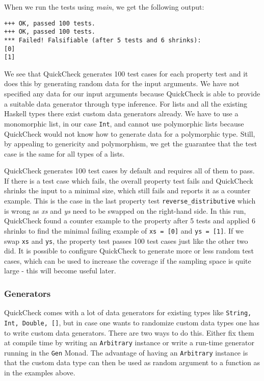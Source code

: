 When we run the tests using \textit{main}, we get the following output:

\begin{verbatim}
+++ OK, passed 100 tests.
+++ OK, passed 100 tests.
*** Failed! Falsifiable (after 5 tests and 6 shrinks):    
[0]
[1]
\end{verbatim}

We see that QuickCheck generates 100 test cases for each property test and it does this by generating random data for the input arguments. We have not specified any data for our input arguments because QuickCheck is able to provide a suitable data generator through type inference. For lists and all the existing Haskell types there exist custom data generators already. We have to use a monomorphic list, in our case \texttt{Int}, and cannot use polymorphic lists because QuickCheck would not know how to generate data for a polymorphic type. Still, by appealing to genericity and polymorphism, we get the guarantee that the test case is the same for all types of a lists.

QuickCheck generates 100 test cases by default and requires all of them to pass. If there is a test case which fails, the overall property test fails and QuickCheck shrinks the input to a minimal size, which still fails and reports it as a counter example. This is the case in the last property test \texttt{reverse\_distributive} which is wrong as \textit{xs} and \textit{ys} need to be swapped on the right-hand side. In this run, QuickCheck found a counter example to the property after 5 tests and applied 6 shrinks to find the minimal failing example of \texttt{xs = [0]} and \texttt{ys = [1]}. If we swap \texttt{xs} and \texttt{ys}, the property test passes 100 test cases just like the other two did. It is possible to configure QuickCheck to generate more or less random test cases, which can be used to increase the coverage if the sampling space is quite large - this will become useful later.

\subsubsection{Generators}
QuickCheck comes with a lot of data generators for existing types like \texttt{String, Int, Double, []}, but in case one wants to randomize custom data types one has to write custom data generators. There are two ways to do this. Either fix them at compile time by writing an \texttt{Arbitrary} instance or write a run-time generator running in the \texttt{Gen} Monad. The advantage of having an \texttt{Arbitrary} instance is that the custom data type can then be used as random argument to a function as in the examples above.

